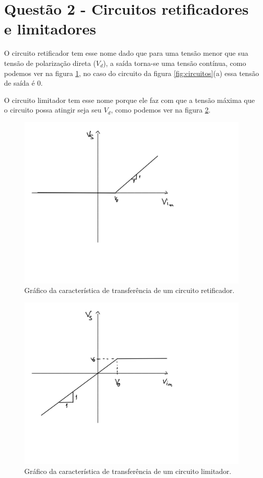 \documentclass{abntex2}
\begin{document}
\section{Questão 2 - Circuitos retificadores e limitadores}

O circuito retificador tem esse nome dado que para uma tensão menor que sua tensão de polarização direta ($V_d$), a saída torna-se uma tensão contínua, como podemos ver na figura \ref{fig:retificador}, no caso do circuito da figura \ref{fig:circuitos}(a) essa tensão de saída é 0.

O circuito limitador tem esse nome porque ele faz com que a tensão máxima que o circuito possa atingir seja seu $V_d$, como podemos ver na figura \ref{fig:limitador}.

\begin{figure}[h]
  \centering
  \includegraphics[scale = 0.2]{grafRetificador.jpeg}
  \caption{Gráfico da característica de transferência de um circuito retificador.}
  \label{fig:retificador}
\end{figure}

\begin{figure}[h]
  \centering
  \includegraphics[scale = 0.75]{grafLimitador.jpg}
  \caption{Gráfico da característica de transferência de um circuito limitador.}
  \label{fig:limitador}
\end{figure}
\end{document}
